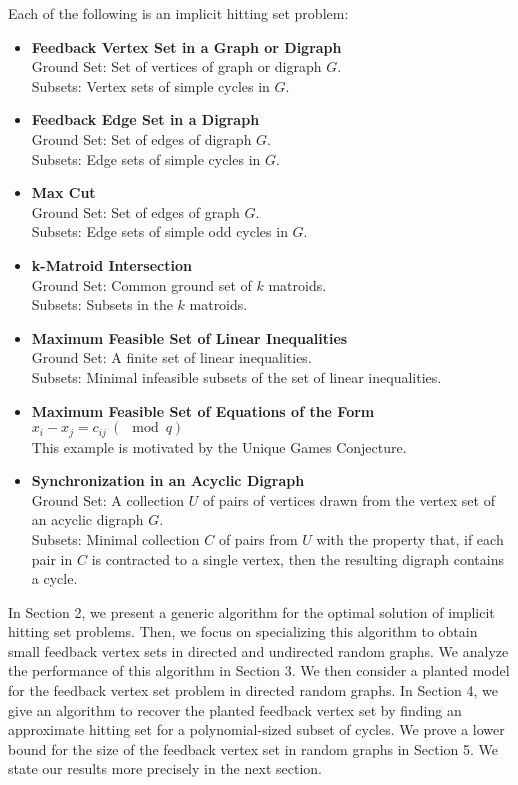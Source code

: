 \documentclass[11pt]{article}
\begin{document}
\noindent Each of the following is an implicit hitting set problem:
\begin{itemize}
\item {\bf Feedback Vertex Set in a Graph or Digraph}\\
Ground Set: Set of vertices of graph or digraph $G$.\\
Subsets: Vertex sets of simple cycles in $G$.


\item {\bf Feedback Edge Set in a Digraph}\\
Ground Set: Set of edges of digraph $G$.\\
Subsets: Edge sets of simple cycles in $G$.


\item {\bf Max Cut}\\
Ground Set: Set of edges of graph $G$.\\
Subsets: Edge sets of simple odd cycles in $G$.


\item {\bf k-Matroid Intersection}\\
Ground Set: Common ground set of $k$ matroids.\\
Subsets: Subsets in the $k$ matroids.

\item {\bf Maximum Feasible Set of Linear Inequalities}\\
Ground Set: A finite set of linear inequalities.\\
Subsets: Minimal infeasible subsets of the set of linear inequalities.


\item {\bf Maximum Feasible Set of Equations of the Form $x_i - x_j = c_{ij}\ (\!\!\!\mod q)$}\\
This example is motivated by the Unique Games Conjecture.

\item {\bf Synchronization in an Acyclic Digraph}\\
Ground Set: A collection $U$ of pairs of vertices drawn from the vertex set of
an acyclic digraph $G$.\\
Subsets: Minimal collection $C$ of pairs from $U$ with the property that, if
each pair in $C$ is contracted to a single vertex, then the resulting digraph
contains a cycle.
\end{itemize}



 In Section 2, we present a generic algorithm for the optimal solution of implicit hitting set problems. Then, we focus on specializing this algorithm to obtain small feedback vertex sets in directed and undirected random graphs. We analyze the performance of this algorithm in Section 3. We then consider a planted model for the feedback vertex set problem in directed random graphs. In Section 4, we give an algorithm to recover the planted feedback vertex set by finding an approximate hitting set for a polynomial-sized subset of cycles. We prove a lower bound for the size of the feedback vertex set in random graphs in Section 5. We state our results more precisely in the next section.
\end{document}
